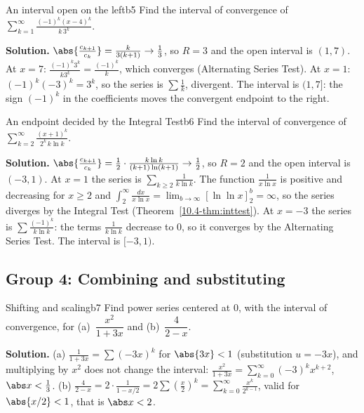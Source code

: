 \documentclass[11pt]{article}
\begin{document}
\begin{exmp}{An interval open on the left}{b5}
Find the interval of convergence of $\displaystyle\sum_{k=1}^\infty\frac{(-1)^k(x-4)^k}{k\,3^k}$.

\textbf{Solution.} $\abs{\frac{c_{k+1}}{c_k}}=\frac k{3(k+1)}\to\frac13$, so $R=3$ and the open interval is $(1,7)$. At $x=7$: $\frac{(-1)^k3^k}{k3^k}=\frac{(-1)^k}k$, which converges (Alternating Series Test). At $x=1$: $(-1)^k(-3)^k=3^k$, so the series is $\sum\frac1k$, divergent. The interval is $(1,7]$: the sign $(-1)^k$ in the coefficients moves the convergent endpoint to the right.
\end{exmp}

\begin{exmp}{An endpoint decided by the Integral Test}{b6}
Find the interval of convergence of $\displaystyle\sum_{k=2}^\infty\frac{(x+1)^k}{2^k\,k\ln k}$.

\textbf{Solution.} $\abs{\frac{c_{k+1}}{c_k}}=\frac12\cdot\frac{k\ln k}{(k+1)\ln(k+1)}\to\frac12$, so $R=2$ and the open interval is $(-3,1)$. At $x=1$ the series is $\sum_{k\ge2}\frac1{k\ln k}$. The function $\frac1{x\ln x}$ is positive and decreasing for $x\ge2$ and $\int_2^\infty\frac{dx}{x\ln x}=\lim_{b\to\infty}\left[\ln\ln x\right]_2^b=\infty$, so the series diverges by the Integral Test (Theorem~\ref{10.4-thm:inttest}). At $x=-3$ the series is $\sum\frac{(-1)^k}{k\ln k}$: the terms $\frac1{k\ln k}$ decrease to $0$, so it converges by the Alternating Series Test. The interval is $[-3,1)$.
\end{exmp}

\subsection*{Group 4: Combining and substituting}

\begin{exmp}{Shifting and scaling}{b7}
Find power series centered at $0$, with the interval of convergence, for (a)~$\dfrac{x^2}{1+3x}$ and (b)~$\dfrac4{2-x}$.

\textbf{Solution.} (a) $\frac1{1+3x}=\sum(-3x)^k$ for $\abs{3x}<1$ (substitution $u=-3x$), and multiplying by $x^2$ does not change the interval: $\frac{x^2}{1+3x}=\sum_{k=0}^\infty(-3)^kx^{k+2}$, $\abs x<\frac13$. (b) $\frac4{2-x}=2\cdot\frac1{1-x/2}=2\sum\left(\frac x2\right)^k=\sum_{k=0}^\infty\frac{x^k}{2^{k-1}}$, valid for $\abs{x/2}<1$, that is $\abs x<2$.
\end{exmp}
\end{document}
